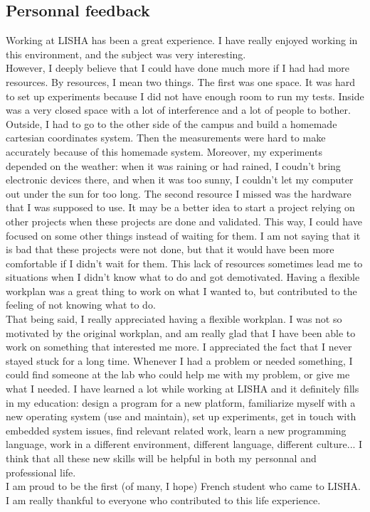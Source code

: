 \documentclass[a4paper,10pt]{article}
\begin{document}
\subsection{Personnal feedback}
Working at LISHA has been a great experience. I have really enjoyed working in this environment, and the subject was very interesting. \\
However, I deeply believe that I could have done much more if I had had more resources. By resources, I mean two things. The first was one space.
It was hard to set up experiments because I did not have enough room to run my tests. Inside was a very closed space with a lot of interference
and a lot of people to bother. Outside, I had to go to the other side of the campus and build a homemade cartesian coordinates system. Then the
measurements were hard to make accurately because of this homemade system. Moreover, my experiments depended on the weather: when it was raining
or had rained, I coudn't bring electronic devices there, and when it was too sunny, I couldn't let my computer out under the sun for too long.
The second resource I missed was the hardware that I was supposed to use. It may be a better idea to start a project relying on other projects
when these projects are done and validated. This way, I could have focused on some other things instead of waiting for them. I am not saying that
it is bad that these projects were not done, but that it would have been more comfortable if I didn't wait for them. This lack of resources
sometimes lead me to situations when I didn't know what to do and got demotivated. Having a flexible workplan was a great thing to work on what I
wanted to, but contributed to the feeling of not knowing what to do.\\
That being said, I really appreciated having a flexible workplan. I was not so motivated  by the original workplan, and am really glad
that I have been able to work on something that interested me more. I appreciated the fact that I never stayed stuck for a long time. Whenever I
had a problem or needed something, I could find someone at the lab who could help me with my problem, or give me what I needed. I have learned a
lot while working at LISHA and it definitely fills in my education: design a program for a new platform, familiarize myself with a new operating
system (use and maintain), set up experiments, get in touch with embedded system issues, find relevant related work, learn a new programming
language, work in a different environment, different language, different culture... I think that all these new skills will be helpful in both my
personnal and professional life.\\
I am proud to be the first (of many, I hope) French student who came to LISHA. I am really thankful to everyone who contributed to this
life experience.
\end{document}
